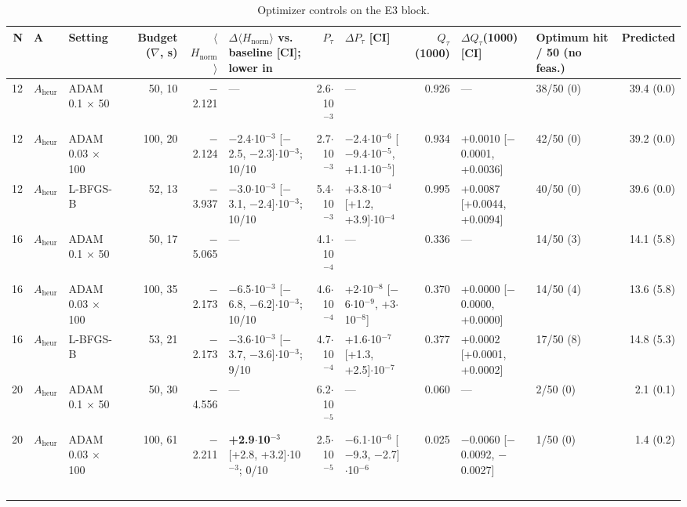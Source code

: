 \documentclass[journal]{IEEEtran}
\begin{document}
\begin{table}[!t]
\centering
\scriptsize
\caption{Optimizer controls on the E3 block.}
\label{tab:S22}
\begin{tabular}{rlp{}rrp{}rp{}rp{}p{}r}
\toprule
N & A & Setting & Budget ($\nabla$, s) & $\langle$$H_{\mathrm{norm}}$$\rangle$ & $\Delta$$\langle$$H_{\mathrm{norm}}$$\rangle$ vs. baseline [CI]; lower in & $P_{\tau}$ & $\Delta$$P_{\tau}$ [CI] & $Q_{\tau}$(1000) & $\Delta$$Q_{\tau}$(1000) [CI] & Optimum hit / 50 (no feas.) & Predicted \\
\midrule
12 & $A_{\mathrm{heur}}$ & ADAM 0.1 $\times$ 50 & 50, 10 & $-$2.121 & --- & 2.6$\cdot$10$^{-3}$ & --- & 0.926 & --- & 38/50 (0) & 39.4 (0.0) \\
12 & $A_{\mathrm{heur}}$ & ADAM 0.03 $\times$ 100 & 100, 20 & $-$2.124 & $-$2.4$\cdot$10$^{-3}$ [$-$2.5, $-$2.3]$\cdot$10$^{-3}$; 10/10 & 2.7$\cdot$10$^{-3}$ & $-$2.4$\cdot$10$^{-6}$ [$-$9.4$\cdot$10$^{-5}$, +1.1$\cdot$10$^{-5}$] & 0.934 & +0.0010 [$-$0.0001, +0.0036] & 42/50 (0) & 39.2 (0.0) \\
12 & $A_{\mathrm{heur}}$ & L-BFGS-B & 52, 13 & $-$3.937 & $-$3.0$\cdot$10$^{-3}$ [$-$3.1, $-$2.4]$\cdot$10$^{-3}$; 10/10 & 5.4$\cdot$10$^{-3}$ & +3.8$\cdot$10$^{-4}$ [+1.2, +3.9]$\cdot$10$^{-4}$ & 0.995 & +0.0087 [+0.0044, +0.0094] & 40/50 (0) & 39.6 (0.0) \\
16 & $A_{\mathrm{heur}}$ & ADAM 0.1 $\times$ 50 & 50, 17 & $-$5.065 & --- & 4.1$\cdot$10$^{-4}$ & --- & 0.336 & --- & 14/50 (3) & 14.1 (5.8) \\
16 & $A_{\mathrm{heur}}$ & ADAM 0.03 $\times$ 100 & 100, 35 & $-$2.173 & $-$6.5$\cdot$10$^{-3}$ [$-$6.8, $-$6.2]$\cdot$10$^{-3}$; 10/10 & 4.6$\cdot$10$^{-4}$ & +2$\cdot$10$^{-8}$ [$-$6$\cdot$10$^{-9}$, +3$\cdot$10$^{-8}$] & 0.370 & +0.0000 [$-$0.0000, +0.0000] & 14/50 (4) & 13.6 (5.8) \\
16 & $A_{\mathrm{heur}}$ & L-BFGS-B & 53, 21 & $-$2.173 & $-$3.6$\cdot$10$^{-3}$ [$-$3.7, $-$3.6]$\cdot$10$^{-3}$; 9/10 & 4.7$\cdot$10$^{-4}$ & +1.6$\cdot$10$^{-7}$ [+1.3, +2.5]$\cdot$10$^{-7}$ & 0.377 & +0.0002 [+0.0001, +0.0002] & 17/50 (8) & 14.8 (5.3) \\
20 & $A_{\mathrm{heur}}$ & ADAM 0.1 $\times$ 50 & 50, 30 & $-$4.556 & --- & 6.2$\cdot$10$^{-5}$ & --- & 0.060 & --- & 2/50 (0) & 2.1 (0.1) \\
20 & $A_{\mathrm{heur}}$ & ADAM 0.03 $\times$ 100 & 100, 61 & $-$2.211 & \textbf{+2.9$\cdot$10$^{-3}$} [+2.8, +3.2]$\cdot$10$^{-3}$; 0/10 & 2.5$\cdot$10$^{-5}$ & $-$6.1$\cdot$10$^{-6}$ [$-$9.3, $-$2.7]$\cdot$10$^{-6}$ & 0.025 & $-$0.0060 [$-$0.0092, $-$0.0027] & 1/50 (0) & 1.4 (0.2) \\
$$
\end{tabular}
\end{table}
\end{document}
